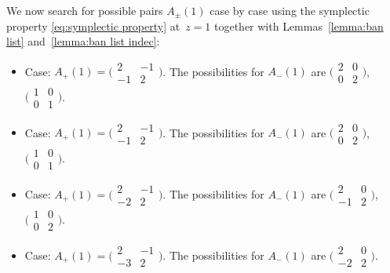 \documentclass[pdftex]{sigma}
\numberwithin{equation}{section}
\theoremstyle{definition}
\begin{document}
We now search for possible pairs $A_\pm(1)$ case by case using the symplectic property
\eqref{eq:symplectic property} at~${z = 1}$ together with Lemmas~\ref{lemma:ban list} and~\ref{lemma:ban list indec}:
\begin{itemize}\itemsep=0pt
\item Case:
 $A_+(1) =
 \bigl(\begin{smallmatrix}
 2 & -1 \\
 -1 & 2
\end{smallmatrix}\bigr)$.
 The possibilities for $A_-(1)$ are
$\bigl(\begin{smallmatrix}
 2 & 0 \\
 0 & 2
\end{smallmatrix}\bigr)$,
$\bigl(\begin{smallmatrix}
 1 & 0 \\
 0 & 1
\end{smallmatrix}\bigr)$.

\item Case:
$A_+(1) =
\bigl(\begin{smallmatrix}
 2 & -1 \\
 -1 & 2
\end{smallmatrix}\bigr)$.
 The possibilities for $A_-(1)$ are $\bigl(\begin{smallmatrix}
 2 & 0 \\
 0 & 2
\end{smallmatrix}\bigr)$, $\bigl(\begin{smallmatrix}
 1 & 0 \\
 0 & 1
\end{smallmatrix}\bigr)$.

\item Case:
$A_+(1) =
\bigl(\begin{smallmatrix}
 2 & -1 \\
 -2 & 2
\end{smallmatrix}\bigr)$.
 The possibilities for $A_-(1)$ are
$\bigl(\begin{smallmatrix}
 2 & 0 \\
 -1 & 2
\end{smallmatrix}\bigr)$, $\bigl(\begin{smallmatrix}
 1 & 0 \\
 0 & 2
\end{smallmatrix}\bigr)$.

\item Case: $A_+(1) =
\bigl(\begin{smallmatrix}
 2 & -1 \\
 -3 & 2
\end{smallmatrix}\bigr)$.
 The possibilities for $A_-(1)$ are $\bigl(\begin{smallmatrix}
 2 & 0 \\
 -2 & 2
\end{smallmatrix}\bigr)$.


\end{itemize}
\end{document}
